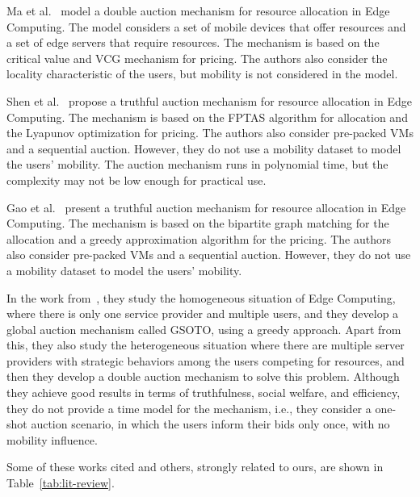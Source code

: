 \documentclass[English]{ic-tese-v3}
\begin{document}
Ma et al.~\cite{MaTCDA2022} model a double auction mechanism for resource allocation in Edge Computing. The model considers a set of mobile devices that offer resources and a set of edge servers that require resources. The mechanism is based on the critical value and VCG mechanism for pricing. The authors also consider the locality characteristic of the users, but mobility is not considered in the model.

Shen et al.~\cite{ShenFPTAS2020} propose a truthful auction mechanism for resource allocation in Edge Computing. The mechanism is based on the FPTAS algorithm for allocation and the Lyapunov optimization for pricing. The authors also consider pre-packed VMs and a sequential auction. However, they do not use a mobility dataset to model the users' mobility. The auction mechanism runs in polynomial time, but the complexity may not be low enough for practical use.

Gao et al.~\cite{GaoAuction2021} present a truthful auction mechanism for resource allocation in Edge Computing. The mechanism is based on the bipartite graph matching for the allocation and a greedy approximation algorithm for the pricing. The authors also consider pre-packed VMs and a sequential auction. However, they do not use a mobility dataset to model the users' mobility.

In the work from~\cite{WeifengAuction2022}, they study the homogeneous situation of Edge Computing, where there is only one service provider and multiple users, and they develop a global auction mechanism called GSOTO, using a greedy approach. Apart from this, they also study the heterogeneous situation where there are multiple server providers with strategic behaviors among the users competing for resources, and then they develop a double auction mechanism to solve this problem. Although they achieve good results in terms of truthfulness, social welfare, and efficiency, they do not provide a time model for the mechanism, i.e., they consider a one-shot auction scenario, in which the users inform their bids only once, with no mobility influence.

Some of these works cited and others, strongly related to ours, are shown in Table~\ref{tab:lit-review}.
\end{document}
